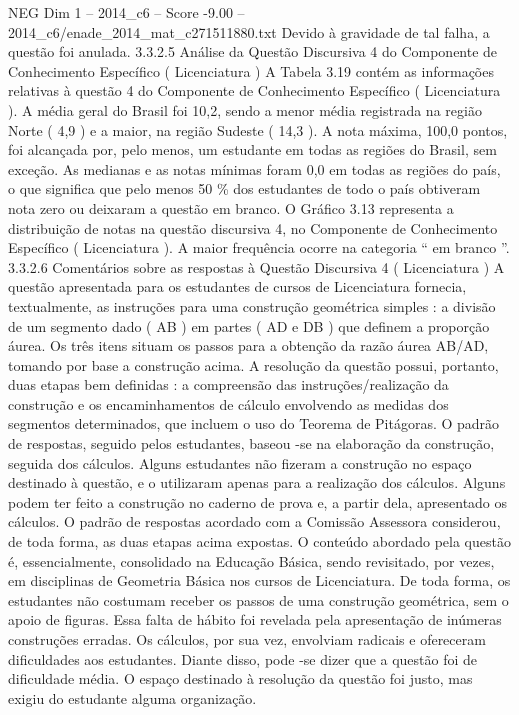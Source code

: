 \begin{textsample}{NEG Dim 1 – 2014\_c6 – Score -9.00 – 2014\_c6/enade\_2014\_mat\_c271511880.txt}
Devido à gravidade de tal falha, a questão foi anulada. 3.3.2.5 Análise da Questão Discursiva 4 do Componente de Conhecimento Específico ( Licenciatura ) A Tabela 3.19 contém as informações relativas à questão 4 do Componente de Conhecimento Específico ( Licenciatura ).
A média geral do Brasil foi 10,2, sendo a menor média registrada na região Norte ( 4,9 ) e a maior, na região Sudeste ( 14,3 ).
A nota máxima, 100,0 pontos, foi alcançada por, pelo menos, um estudante em todas as regiões do Brasil, sem exceção.
As medianas e as notas mínimas foram 0,0 em todas as regiões do país, o que significa que pelo menos 50 \% dos estudantes de todo o país obtiveram nota zero ou deixaram a questão em branco.
O Gráfico 3.13 representa a distribuição de notas na questão discursiva 4, no Componente de Conhecimento Específico ( Licenciatura ).
A maior frequência ocorre na categoria “ em branco ”. 3.3.2.6 Comentários sobre as respostas à Questão Discursiva 4 ( Licenciatura ) A questão apresentada para os estudantes de cursos de Licenciatura fornecia, textualmente, as instruções para uma construção geométrica simples : a divisão de um segmento dado ( AB ) em partes ( AD e DB ) que definem a proporção áurea.
Os três itens situam os passos para a obtenção da razão áurea AB/AD, tomando por base a construção acima.
A resolução da questão possui, portanto, duas etapas bem definidas : a compreensão das instruções/realização da construção e os encaminhamentos de cálculo envolvendo as medidas dos segmentos determinados, que incluem o uso do Teorema de Pitágoras.
O padrão de respostas, seguido pelos estudantes, baseou -se na elaboração da construção, seguida dos cálculos.
Alguns estudantes não fizeram a construção no espaço destinado à questão, e o utilizaram apenas para a realização dos cálculos.
Alguns podem ter feito a construção no caderno de prova e, a partir dela, apresentado os cálculos.
O padrão de respostas acordado com a Comissão Assessora considerou, de toda forma, as duas etapas acima expostas.
O conteúdo abordado pela questão é, essencialmente, consolidado na Educação Básica, sendo revisitado, por vezes, em disciplinas de Geometria Básica nos cursos de Licenciatura.
De toda forma, os estudantes não costumam receber os passos de uma construção geométrica, sem o apoio de figuras.
Essa falta de hábito foi revelada pela apresentação de inúmeras construções erradas.
Os cálculos, por sua vez, envolviam radicais e ofereceram dificuldades aos estudantes.
Diante disso, pode -se dizer que a questão foi de dificuldade média.
O espaço destinado à resolução da questão foi justo, mas exigiu do estudante alguma organização.

\end{textsample}
